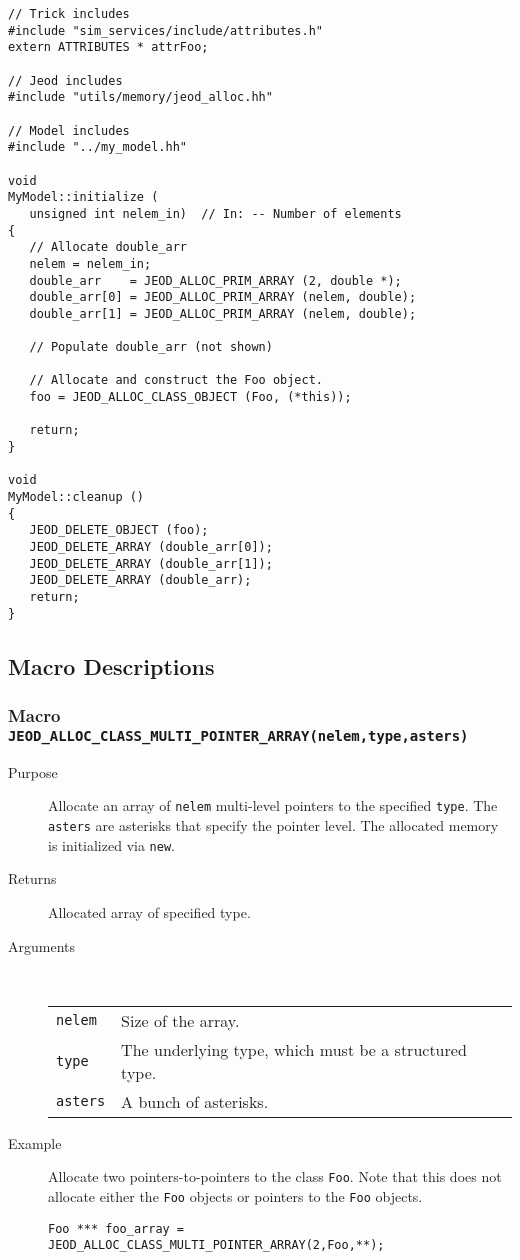 \begin{verbatim}
// Trick includes
#include "sim_services/include/attributes.h"
extern ATTRIBUTES * attrFoo;

// Jeod includes
#include "utils/memory/jeod_alloc.hh"

// Model includes
#include "../my_model.hh"

void
MyModel::initialize (
   unsigned int nelem_in)  // In: -- Number of elements
{
   // Allocate double_arr
   nelem = nelem_in;
   double_arr    = JEOD_ALLOC_PRIM_ARRAY (2, double *);
   double_arr[0] = JEOD_ALLOC_PRIM_ARRAY (nelem, double);
   double_arr[1] = JEOD_ALLOC_PRIM_ARRAY (nelem, double);
   
   // Populate double_arr (not shown)

   // Allocate and construct the Foo object.
   foo = JEOD_ALLOC_CLASS_OBJECT (Foo, (*this));
   
   return;
}

void
MyModel::cleanup ()
{
   JEOD_DELETE_OBJECT (foo);
   JEOD_DELETE_ARRAY (double_arr[0]);
   JEOD_DELETE_ARRAY (double_arr[1]);
   JEOD_DELETE_ARRAY (double_arr);
   return;
}
\end{verbatim}

\subsection{Macro Descriptions}

\subsubsection{Macro {\tt JEOD\_ALLOC\_CLASS\_MULTI\_POINTER\_ARRAY(nelem,type,asters)}}
\begin{description}
\item[Purpose]
Allocate an array of {\tt nelem} multi-level pointers to the specified
{\tt type}. The {\tt asters} are asterisks that specify the pointer level.
The allocated memory is initialized via {\tt new}.
\item[Returns]
Allocated array of specified type.
\item[Arguments] \ \\
\begin{tabular}{@{}ll}
{\tt nelem} &  Size of the array. \\
{\tt type} &  The underlying type, which must be a structured type. \\
{\tt asters} &  A bunch of asterisks. \\
\end{tabular}
\item[Example]
Allocate two pointers-to-pointers to the class {\tt Foo}.
Note that this does not allocate either the {\tt Foo} objects or pointers to
the {\tt Foo} objects.
\begin{verbatim}
Foo *** foo_array = JEOD_ALLOC_CLASS_MULTI_POINTER_ARRAY(2,Foo,**);
\end{verbatim}
\end{description}

